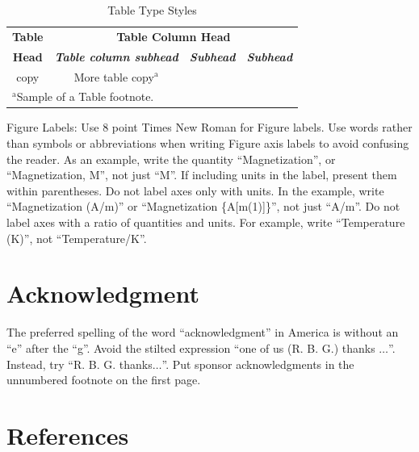 \documentclass[conference]{IEEEtran}
\begin{document}
\begin{table}[htbp]
\caption{Table Type Styles}
\begin{center}
\begin{tabular}{|c|c|c|c|}
\hline
\textbf{Table}&\multicolumn{3}{|c|}{\textbf{Table Column Head}} \\
\cline{2-4} 
\textbf{Head} & \textbf{\textit{Table column subhead}}& \textbf{\textit{Subhead}}& \textbf{\textit{Subhead}} \\
\hline
copy& More table copy$^{\mathrm{a}}$& &  \\
\hline
\multicolumn{4}{l}{$^{\mathrm{a}}$Sample of a Table footnote.}
\end{tabular}
\label{tab1}
\end{center}
\end{table}



Figure Labels: Use 8 point Times New Roman for Figure labels. Use words 
rather than symbols or abbreviations when writing Figure axis labels to 
avoid confusing the reader. As an example, write the quantity 
``Magnetization'', or ``Magnetization, M'', not just ``M''. If including 
units in the label, present them within parentheses. Do not label axes only 
with units. In the example, write ``Magnetization (A/m)'' or ``Magnetization 
\{A[m(1)]\}'', not just ``A/m''. Do not label axes with a ratio of 
quantities and units. For example, write ``Temperature (K)'', not 
``Temperature/K''.

\section*{Acknowledgment}

The preferred spelling of the word ``acknowledgment'' in America is without 
an ``e'' after the ``g''. Avoid the stilted expression ``one of us (R. B. 
G.) thanks $\ldots$''. Instead, try ``R. B. G. thanks$\ldots$''. Put sponsor 
acknowledgments in the unnumbered footnote on the first page.

\section*{References}

\end{document}
